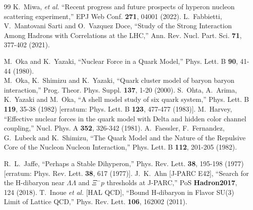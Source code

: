 \documentclass[aps,prd,showpacs,floatfix,reprint,nofootinbib]{revtex4-1}
\begin{document}
\begin{thebibliography}{99}
K.~Miwa, \textit{et al.}
``Recent progress and future prospects of hyperon nucleon scattering experiment,''
EPJ Web Conf. \textbf{271}, 04001 (2022).
L.~Fabbietti, V.~Mantovani Sarti and O.~Vazquez Doce,
``Study of the Strong Interaction Among Hadrons with Correlations at the LHC,''
Ann. Rev. Nucl. Part. Sci. \textbf{71}, 377-402 (2021).


M.~Oka and K.~Yazaki,
``Nuclear Force in a Quark Model,''
Phys. Lett. B \textbf{90}, 41-44 (1980).\\
M.~Oka, K.~Shimizu and K.~Yazaki,
``Quark cluster model of baryon baryon interaction,''
Prog. Theor. Phys. Suppl. \textbf{137}, 1-20 (2000).
S.~Ohta, A.~Arima, K.~Yazaki and M.~Oka,
``A shell model study of six quark system,''
Phys. Lett. B \textbf{119}, 35-38 (1982)
[erratum: Phys. Lett. B \textbf{123}, 477-477 (1983)].
M.~Harvey,
``Effective nuclear forces in the quark model with Delta and hidden color channel coupling,''
Nucl. Phys. A \textbf{352}, 326-342 (1981).
A.~Faessler, F.~Fernandez, G.~Lubeck and K.~Shimizu,
``The Quark Model and the Nature of the Repulsive Core of the Nucleon Nucleon Interaction,''
Phys. Lett. B \textbf{112}, 201-205 (1982).

R.~L.~Jaffe,
``Perhaps a Stable Dihyperon,''
Phys. Rev. Lett. \textbf{38}, 195-198 (1977)
[erratum: Phys. Rev. Lett. \textbf{38}, 617 (1977)].
J.~K.~Ahn [J-PARC E42],
``Search for the H-dibaryon near $\Lambda\Lambda$ and $\Xi^-p$ thresholds at J-PARC,''
PoS \textbf{Hadron2017}, 124 (2018).
T.~Inoue \textit{et al.} [HAL QCD],
``Bound H-dibaryon in Flavor SU(3) Limit of Lattice QCD,''
Phys. Rev. Lett. \textbf{106}, 162002 (2011).


\end{thebibliography}
\end{document}
